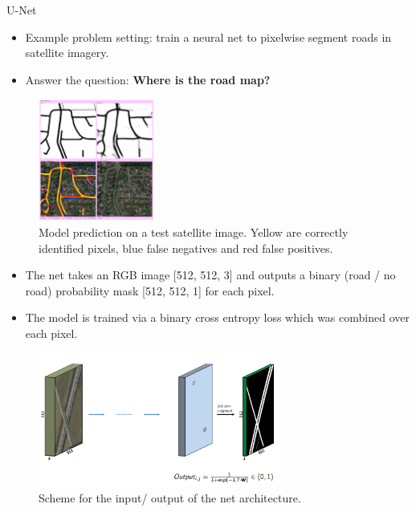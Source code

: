 \begin{vbframe}{U-Net}

    \begin{itemize}
        \item Example problem setting: train a neural net to pixelwise segment roads in satellite imagery.
        \item Answer the question: \textbf{Where is the road map?}
    \end{itemize}
    \begin{figure}
        \centering
        \includegraphics[width=3.8cm]{plots/outlook/31.png}
        \caption{Model prediction on a test satellite image. Yellow are correctly identified pixels, blue false negatives and red false positives.}
    \end{figure}
\framebreak
    \begin{itemize}
        \item The net takes an RGB image [512, 512, 3] and outputs a binary (road / no road) probability mask [512, 512, 1] for each pixel.
        \item The model is trained via a binary cross entropy loss which was combined over each pixel.
    \end{itemize}

  \begin{figure}
        \centering
        \includegraphics[width=8cm]{plots/outlook/architecture_4.png}
        \caption{Scheme for the input/ output of the net architecture.}
    \end{figure}
    
    

\end{vbframe}



